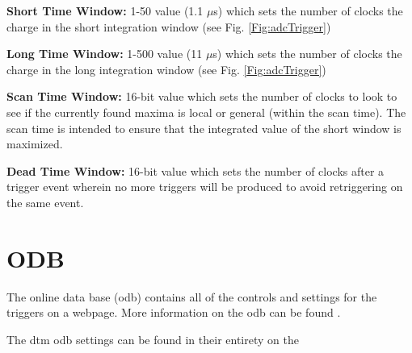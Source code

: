 \begin{description}
\item \textbf{Short Time Window: } 1-50 value (1.1 $\mu$s) which sets the number of clocks the charge in the short integration window (see Fig. \ref{Fig:adcTrigger})

\item \textbf{Long Time Window: }1-500 value (11 $\mu$s) which sets the number of clocks the charge in the long integration window (see Fig. \ref{Fig:adcTrigger})

\item \textbf{Scan Time Window: }16-bit value which sets the number of clocks to look to see if the currently found maxima is local or general (within the scan time). The scan time is intended to ensure that the integrated value of the short window is maximized.

\item \textbf{Dead Time Window: }16-bit value which sets the number of clocks after a trigger event wherein no more triggers will be produced to avoid retriggering on the same event. 

\end{description}

\section{ODB}
\label{sec:odb}
The online data base (\gls{odb}) contains all of the controls and settings for the triggers on a webpage. More information on the \gls{odb} can be found .


The \gls{dtm} \gls{odb} settings can be found in their entirety on the 

